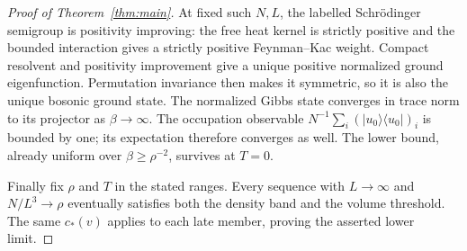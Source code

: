 \begin{proof}[Proof of Theorem~\ref{thm:main}]
At fixed such $N,L$, the labelled Schr\"odinger semigroup is positivity
improving: the free heat kernel is strictly positive and the bounded
interaction gives a strictly positive Feynman--Kac weight.
Compact resolvent and positivity improvement give a unique positive
normalized ground eigenfunction. Permutation invariance then makes it
symmetric, so it is also the unique bosonic ground state. The normalized
Gibbs state converges in trace norm to its projector as
$\beta\to\infty$. The occupation observable
$N^{-1}\sum_i(|u_0\rangle\langle u_0|)_i$ is bounded by one;
its expectation therefore converges as well. The lower bound, already
uniform over $\beta\ge\rho^{-2}$, survives at $T=0$.

Finally fix $\rho$ and $T$ in the stated ranges. Every sequence with
$L\to\infty$ and $N/L^3\to\rho$ eventually satisfies both the density
band and the volume threshold. The same $c_*(v)$ applies to each late
member, proving the asserted lower limit.
\end{proof}

